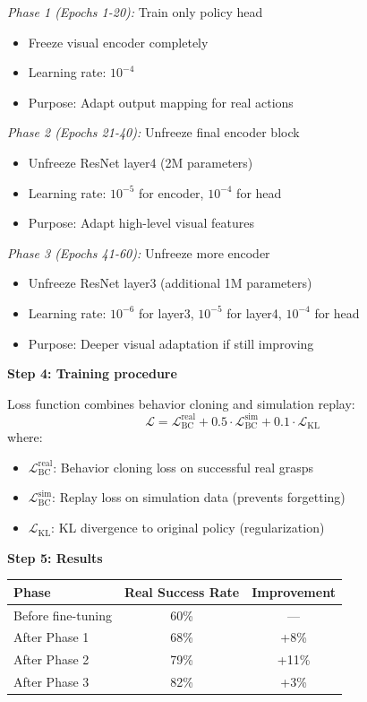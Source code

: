 \begin{example}
\textit{Phase 1 (Epochs 1-20):} Train only policy head
\begin{itemize}
    \item Freeze visual encoder completely
    \item Learning rate: $10^{-4}$
    \item Purpose: Adapt output mapping for real actions
\end{itemize}

\textit{Phase 2 (Epochs 21-40):} Unfreeze final encoder block
\begin{itemize}
    \item Unfreeze ResNet layer4 (2M parameters)
    \item Learning rate: $10^{-5}$ for encoder, $10^{-4}$ for head
    \item Purpose: Adapt high-level visual features
\end{itemize}

\textit{Phase 3 (Epochs 41-60):} Unfreeze more encoder
\begin{itemize}
    \item Unfreeze ResNet layer3 (additional 1M parameters)
    \item Learning rate: $10^{-6}$ for layer3, $10^{-5}$ for layer4, $10^{-4}$ for head
    \item Purpose: Deeper visual adaptation if still improving
\end{itemize}

\textbf{Step 4: Training procedure}

Loss function combines behavior cloning and simulation replay:
\begin{equation}
\mathcal{L} = \mathcal{L}_{\text{BC}}^{\text{real}} + 0.5 \cdot \mathcal{L}_{\text{BC}}^{\text{sim}} + 0.1 \cdot \mathcal{L}_{\text{KL}}
\end{equation}
where:
\begin{itemize}
    \item $\mathcal{L}_{\text{BC}}^{\text{real}}$: Behavior cloning loss on successful real grasps
    \item $\mathcal{L}_{\text{BC}}^{\text{sim}}$: Replay loss on simulation data (prevents forgetting)
    \item $\mathcal{L}_{\text{KL}}$: KL divergence to original policy (regularization)
\end{itemize}

\textbf{Step 5: Results}

\begin{center}
\begin{tabular}{lcc}
\toprule
\textbf{Phase} & \textbf{Real Success Rate} & \textbf{Improvement} \\
\midrule
Before fine-tuning & 60\% & --- \\
After Phase 1 & 68\% & +8\% \\
After Phase 2 & 79\% & +11\% \\
After Phase 3 & 82\% & +3\% \\
\bottomrule
\end{tabular}
\end{center}


\end{example}
